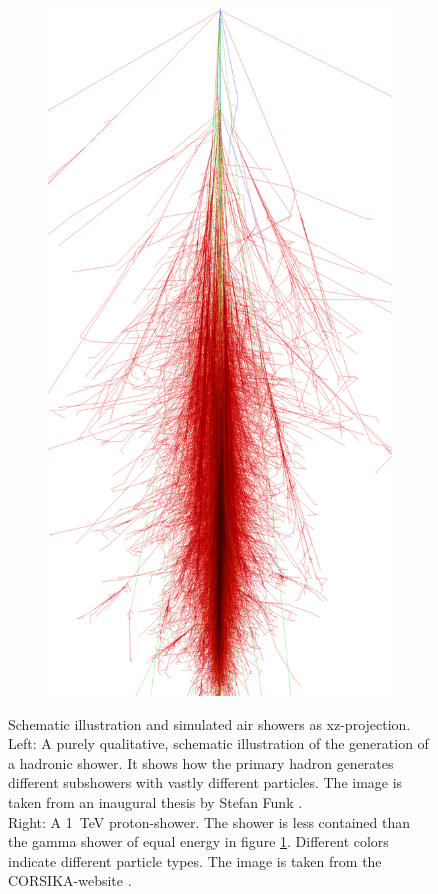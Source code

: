 \begin{figure}
\begin{subfigure}{.3\textwidth}
		\includegraphics[width=.9\linewidth]{images/corsika_1tev_proton.png}
	\end{subfigure}
	\caption{Schematic illustration and simulated air showers as xz-projection.\\
		Left: A purely qualitative,
		schematic illustration of the generation of a hadronic shower.
		It shows how the primary hadron generates different subshowers
		with vastly different particles.
		The image is taken from an inaugural thesis 
		by Stefan Funk \cite{funk_doctor}.\\
		Right: A \SI{1}{\tera\electronvolt} proton-shower.
		The shower is less contained than the gamma shower of equal energy in 
		figure \ref{fig:gamma_shower}.
		Different colors indicate different particle types.
		The image is taken from 
		the CORSIKA-website \cite{corsika_showers}.}
	\label{fig:gamma_shower}
\end{figure}

